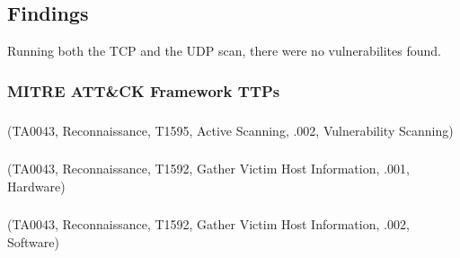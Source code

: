 \documentclass[notitlepage]{article}
\begin{document}
\subsection{Findings}
    Running both the TCP and the UDP scan, there were no vulnerabilites found. 
    \subsubsection{MITRE ATT{\&}CK Framework TTPs}
    \subsubsection*{}
    \ttp(TA0043, Reconnaissance, T1595, Active Scanning, .002, Vulnerability Scanning)
    \subsubsection*{}
    \ttp(TA0043, Reconnaissance, T1592, Gather Victim Host Information, .001, Hardware)
    \subsubsection*{}
    \ttp(TA0043, Reconnaissance, T1592, Gather Victim Host Information, .002, Software)
\end{document}
